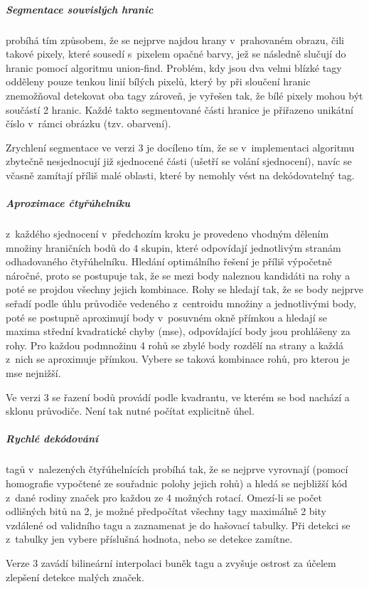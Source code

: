   \subparagraph{Segmentace souvislých hranic} probíhá tím způsobem, že se nejprve najdou hrany v~prahovaném obrazu, čili takové pixely, které sousedí s~pixelem opačné barvy, jež se následně slučují do hranic pomocí algoritmu union-find. Problém, kdy jsou dva velmi blízké tagy odděleny pouze tenkou linií bílých pixelů, který by při sloučení hranic znemožňoval detekovat oba tagy zároveň, je vyřešen tak, že bílé pixely mohou být součástí 2 hranic. Každé takto segmentované části hranice je přiřazeno unikátní číslo v~rámci obrázku (tzv. obarvení). \cite{apriltag2}
  
  Zrychlení segmentace ve verzi 3 je docíleno tím, že se v~implementaci algoritmu zbytečně nesjednocují již sjednocené části (ušetří se volání sjednocení), navíc se včasně zamítají příliš malé oblasti, které by nemohly vést na dekódovatelný tag. \cite{apriltag3}

  \subparagraph{Aproximace čtyřúhelníku} z~každého sjednocení v~předchozím kroku je provedeno vhodným dělením množiny hraničních bodů do 4 skupin, které odpovídají jednotlivým stranám odhadovaného čtyřúhelníku. Hledání optimálního řešení je příliš výpočetně náročné, proto se postupuje tak, že se mezi body naleznou kandidáti na rohy a poté se projdou všechny jejich kombinace. Rohy se hledají tak, že se body nejprve seřadí podle úhlu průvodiče vedeného z~centroidu množiny a jednotlivými body, poté se postupně aproximují body v~posuvném okně přímkou a hledají se maxima střední kvadratické chyby (\acrshort{mse}), odpovídající body jsou prohlášeny za rohy. Pro každou podmnožinu 4 rohů se zbylé body rozdělí na strany a každá z~nich se aproximuje přímkou. Vybere se taková kombinace rohů, pro kterou je \acrshort{mse} nejnižší. \cite{apriltag2}
  
  Ve verzi 3 se řazení bodů provádí podle kvadrantu, ve kterém se bod nachází a sklonu průvodiče. Není tak nutné počítat explicitně úhel. \cite{apriltag3}

  \subparagraph{Rychlé dekódování} tagů v~nalezených čtyřúhelnících probíhá tak, že se nejprve vyrovnají (pomocí homografie vypočtené ze souřadnic polohy jejich rohů) a hledá se nejbližší kód z~dané rodiny značek pro každou ze 4 možných rotací. Omezí-li se počet odlišných bitů na 2, je možné předpočítat všechny tagy maximálně 2 bity vzdálené od validního tagu a zaznamenat je do hašovací tabulky. Při detekci se z~tabulky jen vybere příslušná hodnota, nebo se detekce zamítne. \cite{apriltag2}
  
  Verze 3 zavádí bilineární interpolaci buněk tagu a zvyšuje ostrost za účelem zlepšení detekce malých značek. \cite{apriltag3}